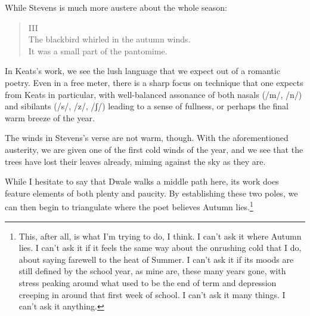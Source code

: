 \documentclass[12pt,oneside]{memoir}
\begin{document}
While Stevens is much more austere about the whole season:

\begin{verse}
III \\
The blackbird whirled in the autumn winds. \\
It was a small part of the pantomime.

\parencite{blackbird}
\end{verse}

In Keats's work, we see the lush language that we expect out of a romantic poetry. Even in a free meter, there is a sharp focus on technique that one expects from Keats in particular, with well-balanced assonance of both nasals (/{\IPAfont m}/, /{\IPAfont n}/) and sibilants (/{\IPAfont s}/, /{\IPAfont z}/, /{\IPAfont ʃ}/) leading to a sense of fullness, or perhaps the final warm breeze of the year.

The winds in Stevens's verse are not warm, though. With the aforementioned austerity, we are given one of the first cold winds of the year, and we see that the trees have lost their leaves already, miming against the sky as they are.

While I hesitate to say that Dwale walks a middle path here, its work does feature elements of both plenty and paucity. By establishing these two poles, we can then begin to triangulate where the poet believes Autumn lies.\footnote{This, after all, is what I'm trying to do, I think. I can't ask it where Autumn lies. I can't ask it if it feels the same way about the onrushing cold that I do, about saying farewell to the heat of Summer. I can't ask it if its moods are still defined by the school year, as mine are, these many years gone, with stress peaking around what used to be the end of term and depression creeping in around that first week of school. I can't ask it many things. I can't ask it anything.}
\end{document}
